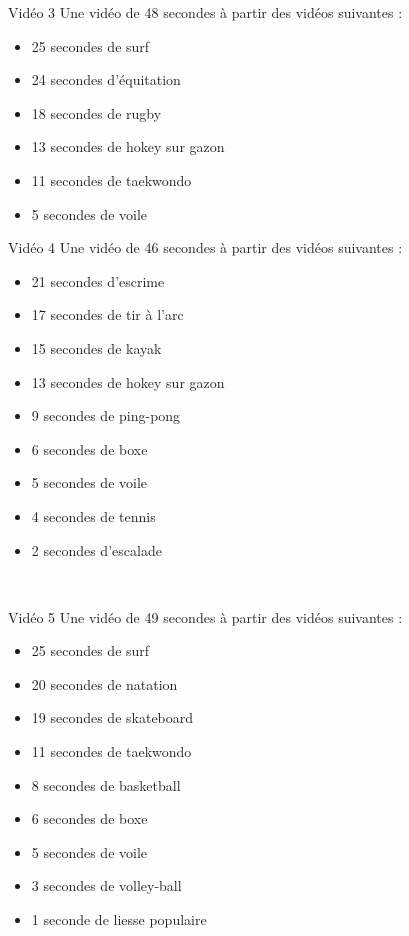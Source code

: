 \documentclass[10pt, a5paper,twoside]{article}
\begin{document}
\begin{card}[width = \textwidth, colback = olympicblue, colframe = olympicblue, bottomtitle = 2mm]{Vidéo 3}
  Une vidéo de 48 secondes à partir des vidéos suivantes :
  \vspace{-1mm}\begin{itemize}
    \item 25 secondes de surf
    \item 24 secondes d'équitation
    \item 18 secondes de rugby
    \item 13 secondes de hokey sur gazon
    \item 11 secondes de taekwondo
    \item 5 secondes de voile
  \end{itemize}
\end{card}

\vfill

\begin{card}[width = \textwidth, colback = olympicblue, colframe = olympicblue, bottomtitle = 2mm]{Vidéo 4}
  Une vidéo de 46 secondes à partir des vidéos suivantes :
  \vspace{-1mm}\begin{itemize}
    \item 21 secondes d'escrime
    \item 17 secondes de tir à l'arc
    \item 15 secondes de kayak
    \item 13 secondes de hokey sur gazon
    \item 9 secondes de ping-pong
    \item 6 secondes de boxe
    \item 5 secondes de voile
    \item 4 secondes de tennis
    \item 2 secondes d'escalade
  \end{itemize}
\end{card}

\vfill

\clearpage
~
\vfill

\begin{card}[width = \textwidth, colback = olympicblue, colframe = olympicblue, bottomtitle = 2mm]{Vidéo 5}
  Une vidéo de 49 secondes à partir des vidéos suivantes :
  \vspace{-1mm}\begin{itemize}
    \item 25 secondes de surf
    \item 20 secondes de natation
    \item 19 secondes de skateboard
    \item 11 secondes de taekwondo
    \item 8 secondes de basketball
    \item 6 secondes de boxe
    \item 5 secondes de voile
    \item 3 secondes de volley-ball
    \item 1 seconde de liesse populaire
  \end{itemize}
\end{card}
\end{document}
